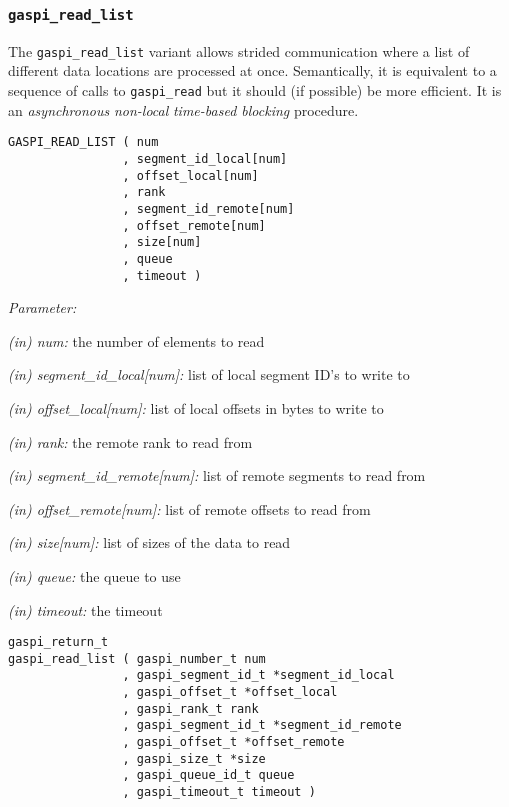 \documentclass[a4paper]{article}
\newlength{\st}\setlength{\st}{0pt}
\newcommand{\zsep}[1]{#1}
\newcommand{\gaspiprefix}{gaspi}
\newcommand{\function}[1]{{\tt #1}}
\newcommand{\parameter}[1]{{\it #1}}
\newcommand{\gaspifunction}[1]{\function{\protect\zsep{\gaspiprefix\_#1}}}
\newenvironment{cbox}[1]
{\newcommand\colboxcolor{#1}\begin{lrbox}{\riddlebox}\begin{minipage}{\dimexpr\columnwidth-2\fboxsep\relax}}
{\end{minipage}\end{lrbox}\begin{center}\colorbox[HTML]{\colboxcolor}{\usebox{\riddlebox}}\end{center}}
\newcommand{\shortlistbegin}[1]{\begin{trivlist}\setlength{\itemsep}{0pt}\item[]\emph{#1:}}
\newcommand{\shortlistitem}[1]{\item[]#1}
\newcommand{\shortlistend}{\end{trivlist}}
\newenvironment{FDef}{\begin{trivlist}\item[]}{\end{trivlist}}
\newenvironment{FDefSign}{\begin{cbox}{EEEEEE}}{\end{cbox}}
\newcommand{\parameterlistbegin}{\shortlistbegin{Parameter}}
\newcommand{\parameterlistend}{\shortlistend}
\newcommand{\parameterlistitem}[3]{\shortlistitem{\parameter{(#1) #2:} {#3}}}
\newcommand{\gaspisemantic}[1]{{\emph{#1}}}
\begin{document}
\subsubsection{\gaspifunction{read\_list}}

The \gaspifunction{read\_list} variant allows strided communication
where a list of different data locations are processed at
once. Semantically, it is equivalent to a sequence of calls to
\gaspifunction{read} but it should (if possible) be more efficient.
It is an \gaspisemantic{asynchronous}
\gaspisemantic{non-local} \gaspisemantic{time-based blocking}
procedure.

\begin{FDef}
\begin{FDefSign}
\begin{verbatim}
GASPI_READ_LIST ( num
                , segment_id_local[num]
                , offset_local[num]
                , rank
                , segment_id_remote[num]
                , offset_remote[num]
                , size[num]
                , queue
                , timeout )
\end{verbatim}
\end{FDefSign}

\parameterlistbegin
\parameterlistitem{in}{num}{the number of elements to read}
\parameterlistitem{in}{segment\_id\_local[num]}{list of local segment ID's to write to}
\parameterlistitem{in}{offset\_local[num]}{list of local offsets in bytes to write to}
\parameterlistitem{in}{rank}{the remote rank to read from}
\parameterlistitem{in}{segment\_id\_remote[num]}{list of remote segments to read from}
\parameterlistitem{in}{offset\_remote[num]}{list of remote offsets to read from}
\parameterlistitem{in}{size[num]}{list of sizes of the data to read}
\parameterlistitem{in}{queue}{the queue to use}
\parameterlistitem{in}{timeout}{the timeout}
\parameterlistend

\begin{FDefSign}
\begin{verbatim}
gaspi_return_t
gaspi_read_list ( gaspi_number_t num
                , gaspi_segment_id_t *segment_id_local
                , gaspi_offset_t *offset_local
                , gaspi_rank_t rank
                , gaspi_segment_id_t *segment_id_remote
                , gaspi_offset_t *offset_remote
                , gaspi_size_t *size
                , gaspi_queue_id_t queue
                , gaspi_timeout_t timeout )
\end{verbatim}
\end{FDefSign}


\end{FDef}
\end{document}
